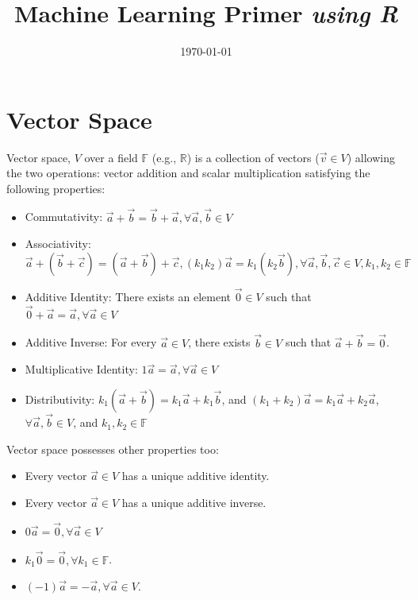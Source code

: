 \documentclass[conference,final,11pt,technote,onecolumn]{IEEEtran}\usepackage[]{graphicx}\usepackage[]{color}
\begin{document}
	
	\title{ \LARGE{Machine Learning Primer \emph{using R}}}
	\author{
  		\IEEEauthorblockA{}
	}
	\date{\today}
	\maketitle

	\section{Vector Space}
	\label{term:vector_space}
Vector space, $V$ over a field $\mathbb{F}$ (e.g., $\mathbb{R}$) is a collection of vectors ($\vec v\in V$) allowing the two operations: vector addition and scalar multiplication satisfying the following properties:
\begin{itemize}
\item Commutativity: $\vec a + \vec b = \vec b + \vec a, \forall \vec a, \vec b\in V$
\item Associativity: $\vec a + (\vec b + \vec c) = (\vec a + \vec b) + \vec c, (k_1k_2)\vec a = k_1(k_2\vec b), \forall \vec a, \vec b, \vec c \in V, k_1,k_2\in \mathbb{F}$
\item Additive Identity: There exists an element $\vec 0\in V$ such that $\vec 0 + \vec a = \vec a, \forall \vec a\in V$
\item Additive Inverse: For every $\vec a\in V$, there exists $\vec b\in V$ such that $\vec a + \vec b = \vec 0$.
\item Multiplicative Identity: $1\vec a = \vec a, \forall \vec a\in V$
\item Distributivity: $k_1(\vec a + \vec b) = k_1\vec a + k_1\vec b$, and $(k_1 + k_2)\vec a = k_1\vec a + k_2\vec a$, $ \forall \vec a, \vec b\in V$, and $k_1, k_2\in \mathbb{F}$
\end{itemize}

Vector space possesses other properties too:
\begin{itemize}
\item Every vector $\vec a\in V$ has a unique additive identity.
\item Every vector $\vec a\in V$ has a unique additive inverse.
\item $0\vec a = \vec 0, \forall \vec a \in V$
\item $k_1\vec 0 = \vec 0, \forall k_1\in \mathbb{F}$.
\item $(-1)\vec a = -\vec a, \forall \vec a \in V$.
\end{itemize}
\end{document}
